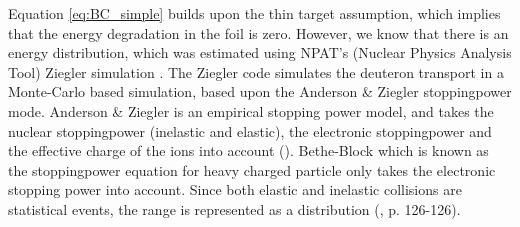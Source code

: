 Equation \ref{eq:BC_simple} builds upon the thin target assumption, which implies that the energy degradation in the foil is zero. However, we know that there is an energy distribution, which was estimated using NPAT's (Nuclear Physics Analysis Tool) Ziegler simulation \cite{MorellJ.}. The Ziegler code simulates the deuteron transport in a Monte-Carlo based simulation, based upon the Anderson \& Ziegler stoppingpower mode\cite{Ziegler1999}. Anderson \& Ziegler is an empirical stopping power model, and takes the nuclear stoppingpower (inelastic and elastic), the electronic stoppingpower and the effective charge of the ions into account (\cite{Backlin1986, p. 96}). Bethe-Block which is known as the stoppingpower equation for heavy charged particle only takes the electronic stopping power into account. %
Since both elastic and inelastic collisions are statistical events, the range is represented as a distribution  (\cite{Backlin1986}, p. 126-126). %
